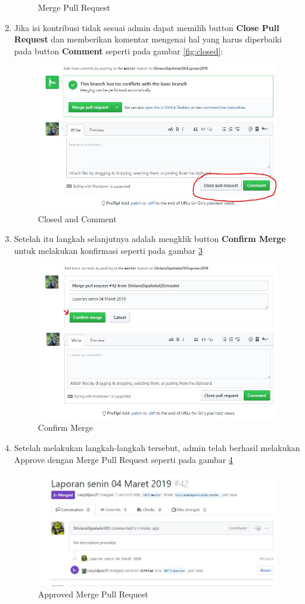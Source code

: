 \begin{enumerate}
\begin{figure}[!htbp]
\caption{Merge Pull Request}
\label{fig:mergepull}
\end{figure}
\item Jika isi kontribusi tidak sesuai admin dapat memilih button \textbf{Close Pull Request} dan memberikan komentar mengenai hal yang harus diperbaiki pada button \textbf{Comment} seperti pada gambar \ref{fig:closed}:
\subitem
\begin{figure}[!htbp]
\centerline{\includegraphics[width=.75\textwidth]{Figures/membacapr/mr4.JPG}}
\caption{Closed and Comment}
\label{fig:Closed}
\end{figure}
\item Setelah itu langkah selanjutnya adalah mengklik button \textbf{Confirm Merge} untuk melakukan konfirmasi seperti pada gambar \ref{fig:confirm}
\subitem
\begin{figure}[!htbp]
\centerline{\includegraphics[width=.75\textwidth]{Figures/membacapr/mr5.JPG}}
\caption{Confirm Merge}
\label{fig:confirm}
\end{figure}
\item Setelah melakukan langkah-langkah tersebut, admin telah berhasil melakukan Approve dengan Merge Pull Request seperti pada gambar \ref{fig:approvepull}
\subitem
\begin{figure}[!htbp]
\centerline{\includegraphics[width=.75\textwidth]{Figures/membacapr/mr6.JPG}}
\caption{Approved Merge Pull Request}
\label{fig:approvepull}
\end{figure}
\end{enumerate}